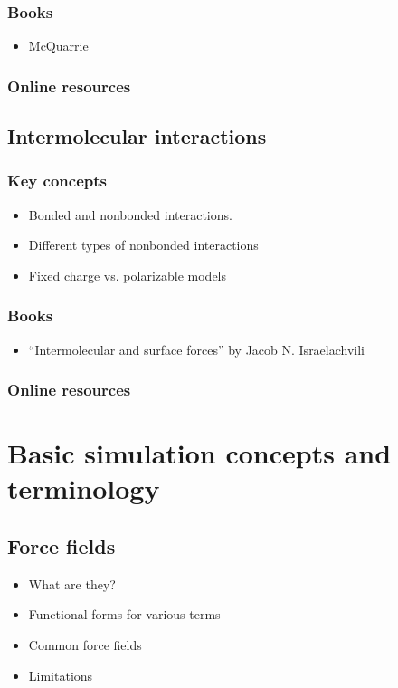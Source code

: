 \documentclass[9pt,bestpractices]{livecoms}
\begin{document}
\subsubsection{Books}
\begin{itemize}
\item McQuarrie
\end{itemize}
\subsubsection{Online resources}

\subsection{Intermolecular interactions}
\subsubsection{Key concepts}
\begin{itemize}
\item Bonded and nonbonded interactions. 
\item Different types of nonbonded interactions
\item Fixed charge vs. polarizable models
\end{itemize}
\subsubsection{Books}
\begin{itemize}
\item “Intermolecular and surface forces” by Jacob N. Israelachvili
\end{itemize}
\subsubsection{Online resources}

\section{Basic simulation concepts and terminology}

\subsection{Force fields}
\begin{itemize}
\item What are they?
\item Functional forms for various terms
\item Common force fields
\item Limitations
\end{itemize}
\end{document}
